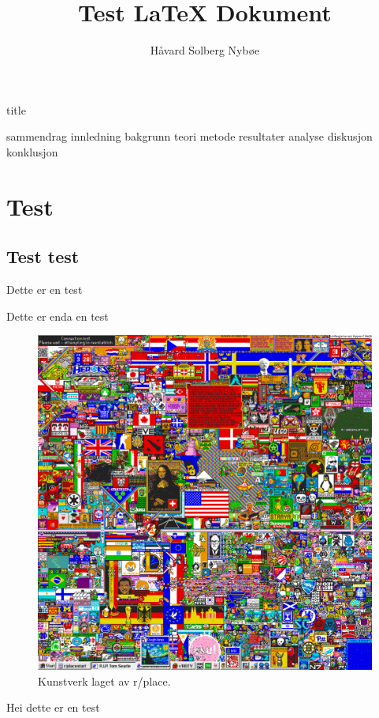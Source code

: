 \documentclass[a4paper, 12pt]{article}
\title{Test {\LaTeX} Dokument}
\author{Håvard Solberg Nybøe}
\begin{document}

{title}
\newpage

\tableofcontents
\listoffigures
\listoftables
\newpage


{sammendrag}
{innledning}
{bakgrunn}
{teori}
{metode}
{resultater}
{analyse}
{diskusjon}
{konklusjon}

\section{Test}
\subsection{Test test}
Dette er en test

Dette er enda en test
    
    \begin{figure}[h]\label{r/place}
        \centering
        \includegraphics[width=.6\textwidth]{img/r_place.png}
        \caption{Kunstverk laget av r/place.}
    \end{figure}

    Hei dette er en test    
    
    \newpage

\printbibliography[heading=bibintoc]
    
\end{document}
